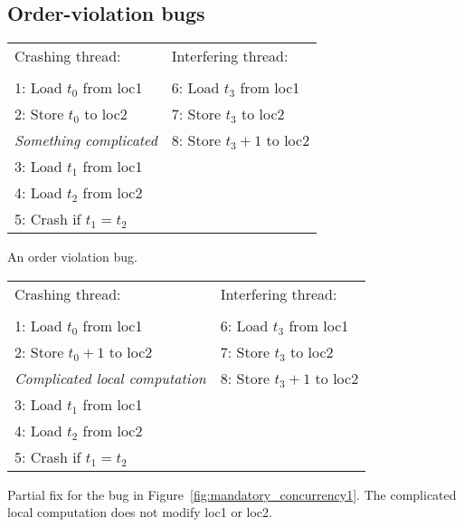 \subsection{Order-violation bugs}

\begin{sanefig}
{\hfill}
\begin{tabular}{p{8cm}l}
Crashing thread:\hfill         & Interfering thread: \\
\\
1: Load $t_0$ from loc1        & 6: Load $t_3$ from loc1 \\
2: Store $t_0$ to loc2         & 7: Store $t_3$ to loc2 \\
\textit{Something complicated} & 8: Store $t_3 + 1$ to loc2 \\
3: Load $t_1$ from loc1        & \\
4: Load $t_2$ from loc2        & \\
5: Crash if $t_1 = t_2$ & \\
\end{tabular}
{\hfill}
\caption{An order violation bug.}
\label{fig:mandatory_concurrency1}
\end{sanefig}

\begin{sanefig}
\begin{centering}
\hfill
\begin{tabular}{p{8cm}l}
Crashing thread:          & Interfering thread: \\
\\
1: Load $t_0$ from loc1        & 6: Load $t_3$ from loc1 \\
2: Store $t_0+1$ to loc2       & 7: Store $t_3$ to loc2 \\
\textit{Complicated local computation} & 8: Store $t_3 + 1$ to loc2 \\
3: Load $t_1$ from loc1        & \\
4: Load $t_2$ from loc2        & \\
5: Crash if $t_1 = t_2$ & \\
\end{tabular}
\hfill
\end{centering}
\caption{Partial fix for the bug in
  Figure~\ref{fig:mandatory_concurrency1}.  The complicated local
  computation does not modify loc1 or loc2.}
\label{fig:mandatory_concurrency2}
\end{sanefig}


